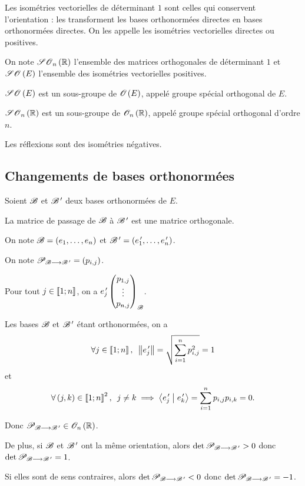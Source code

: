 Les isométries vectorielles de déterminant \(1\) sont celles qui conservent l'orientation : les transforment les bases orthonormées directes en bases orthonormées directes. On les appelle les isométries vectorielles directes ou positives.

On note \(\SO{n}[\R]\) l'ensemble des matrices orthogonales de déterminant \(1\) et \(\SO{}[E]\) l'ensemble des isométries vectorielles positives.

\begin{prop}
\(\SO{}[E]\) est un sous-groupe de \(\Orth{}[E]\), appelé groupe spécial orthogonal de \(E\).

\(\SO{n}[\R]\) est un sous-groupe de \(\Orth{n}[\R]\), appelé groupe spécial orthogonal d'ordre \(n\).
\end{prop}

Les réflexions sont des isométries négatives.

\subsection{Changements de bases orthonormées}

\begin{prop}
Soient \(\mathscr{B}\) et \(\mathscr{B}^{\,\prime}\) deux bases orthonormées de \(E\).

La matrice de passage de \(\mathscr{B}\) à \(\mathscr{B}^{\,\prime}\) est une matrice orthogonale.
\end{prop}

\begin{dem}
On note \(\mathscr{B}=\left(e_1,\dots,e_n\right)\) et \(\mathscr{B}^{\,\prime}=\left(e_1^{\,\prime},\dots,e_n^{\,\prime}\right)\).

On note \(\mathscr{P}_{\mathscr{B}\longrightarrow\mathscr{B}^{\,\prime}}=\left(p_{i,j}\right)\).

Pour tout \(j\in\left\llbracket1;n\right\rrbracket\), on a \(e_j^{\,\prime}\begin{pmatrix}p_{1,j}\\\vdots\\p_{n,j}\end{pmatrix}_{\mathscr{B}}\).

Les bases \(\mathscr{B}\) et \(\mathscr{B}^{\,\prime}\) étant orthonormées, on a \[\quantifs{\forall j\in\interventierii{1}{n}}\norme{e_j\prim}=\sqrt{\sum_{i=1}^np_{i,j}^2}=1\] et \[\quantifs{\forall\paren{j,k}\in\interventierii{1}{n}^2}j\not=k\imp\ps{e_j\prim}{e_k\prim}=\sum_{i=1}^np_{i,j}p_{i,k}=0.\]

Donc \(\pass{\fami{B}}{\fami{B}\prim}\in\Orth{n}[\R]\).
\end{dem}

\begin{rem}
De plus, si \(\mathscr{B}\) et \(\mathscr{B}^{\,\prime}\) ont la même orientation, alors \(\det\mathscr{P}_{\mathscr{B}\longrightarrow\mathscr{B}^{\,\prime}}>0\) donc \(\det\mathscr{P}_{\mathscr{B}\longrightarrow\mathscr{B}^{\,\prime}}=1\).

Si elles sont de sens contraires, alors \(\det\mathscr{P}_{\mathscr{B}\longrightarrow\mathscr{B}^{\,\prime}}<0\) donc \(\det\mathscr{P}_{\mathscr{B}\longrightarrow\mathscr{B}^{\,\prime}}=-1\).
\end{rem}

